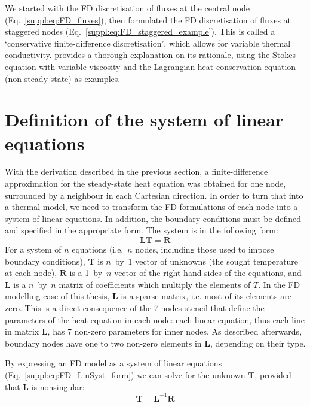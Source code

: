 We started with the FD discretisation of fluxes at the central node (Eq.~\ref{suppl:eq:FD_fluxes}), then formulated the FD discretisation of fluxes at staggered nodes (Eq.~\ref{suppl:eq:FD_staggered_example}).
This is called a `conservative finite-difference discretisation', which allows for variable thermal conductivity.
\textcite{Gerya2010} provides a thorough explanation on its rationale, using the Stokes equation with variable viscosity and the Lagrangian heat conservation equation (non-steady state) as examples.

\section{Definition of the system of linear equations}
\label{s:ThermModel:FD_LinSyst}
With the derivation described in the previous section, a finite-difference approximation for the steady-state heat equation was obtained for one node, surrounded by a neighbour in each Cartesian direction.
In order to turn that into a thermal model, we need to transform the FD formulations of each node into a system of linear equations.
In addition, the boundary conditions must be defined and specified in the appropriate form.
The system is in the following form:
\begin{equation}
    \label{suppl:eq:FD_LinSyst_form}
    \bm{L} \bm{T} = \bm{R}
\end{equation}
For a system of $n$ equations (i.e.~$n$ nodes, including those used to impose boundary conditions), $\bm{T}$ is $n$~by~\num{1} vector of unknowns (the sought temperature at each node), $\bm{R}$ is a \num{1}~by~$n$ vector of the right-hand-sides of the equations, and $\bm{L}$ is a $n$~by~$n$ matrix of coefficients which multiply the elements of $T$.
In the FD modelling case of this thesis, $\bm{L}$ is a sparse matrix, i.e. most of its elements are zero.
This is a direct consequence of the 7-nodes stencil that define the parameters of the heat equation in each node: each linear equation, thus each line in matrix $\bm{L}$, has 7 non-zero parameters for inner nodes.
As described afterwards, boundary nodes have one to two non-zero elements in $\bm{L}$, depending on their type.

By expressing an FD model as a system of linear equations (Eq.~\ref{suppl:eq:FD_LinSyst_form}) we can solve for the unknown $\bm{T}$, provided that $\bm{L}$ is nonsingular:
\begin{equation}
    \label{suppl:eq:FD_LinSyst_inversion}
    \bm{T} = \bm{L}^{-1} \bm{R}
\end{equation}

